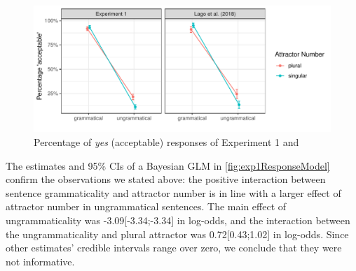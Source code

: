 \documentclass[doc,a4paper,man,natbib,floatsintext,noextraspace]{apa6}\usepackage[]{graphicx}\usepackage[]{color}
\makeatletter
\def\maxwidth{ %
  \ifdim\Gin@nat@width>\linewidth
    \linewidth
  \else
    \Gin@nat@width
  \fi
}
\newenvironment{knitrout}{}{} %
\makeatother
\begin{document}
\begin{knitrout}
\color{fgcolor}\begin{figure}

{\centering \includegraphics[width=\maxwidth]{figure/exp1AvgResponse-1} 

}

\caption{Percentage of \emph{yes} (acceptable) responses of Experiment 1 and \citet{LagoEtAl:2018}}\label{fig:exp1AvgResponse}
\end{figure}


\end{knitrout}



The estimates and 95\% CIs of a Bayesian GLM in \autoref{fig:exp1ResponseModel} confirm the observations we stated above: the positive interaction between sentence grammaticality and attractor number is in line with a larger effect of attractor number in ungrammatical sentences. The main effect of ungrammaticality was -3.09[-3.34;-3.34] in log-odds, and the interaction between the ungrammaticality and plural attractor was 0.72[0.43;1.02] in log-odds. Since other estimates' credible intervals range over zero, we conclude that they were not informative. %

\end{document}
